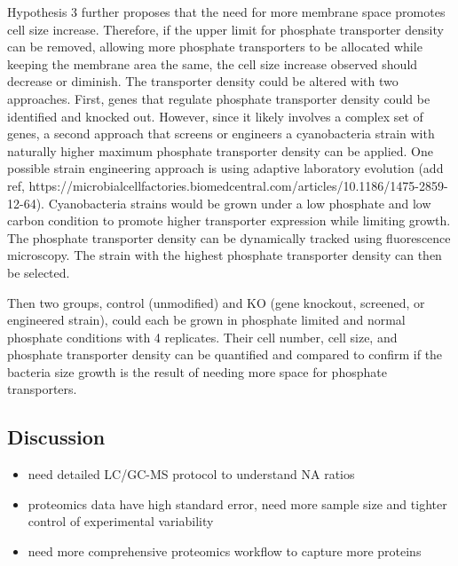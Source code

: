 Hypothesis 3 further proposes that the need for more membrane space
promotes cell size increase. Therefore, if the upper limit for phosphate
transporter density can be removed, allowing more phosphate transporters
to be allocated while keeping the membrane area the same, the cell size
increase observed should decrease or diminish. The transporter density
could be altered with two approaches. First, genes that regulate
phosphate transporter density could be identified and knocked out.
However, since it likely involves a complex set of genes, a second
approach that screens or engineers a cyanobacteria strain with naturally
higher maximum phosphate transporter density can be applied. One
possible strain engineering approach is using adaptive laboratory
evolution (add ref,
https://microbialcellfactories.biomedcentral.com/articles/10.1186/1475-2859-12-64).
Cyanobacteria strains would be grown under a low phosphate and low
carbon condition to promote higher transporter expression while limiting
growth. The phosphate transporter density can be dynamically tracked
using fluorescence microscopy. The strain with the highest phosphate
transporter density can then be selected.

Then two groups, control (unmodified) and KO (gene knockout, screened,
or engineered strain), could each be grown in phosphate limited and
normal phosphate conditions with 4 replicates. Their cell number, cell
size, and phosphate transporter density can be quantified and compared
to confirm if the bacteria size growth is the result of needing more
space for phosphate transporters.

\subsection{Discussion}\label{discussion}

\begin{itemize}
\tightlist
\item
  need detailed LC/GC-MS protocol to understand NA ratios
\item
  proteomics data have high standard error, need more sample size and
  tighter control of experimental variability
\item
  need more comprehensive proteomics workflow to capture more proteins
\end{itemize}
